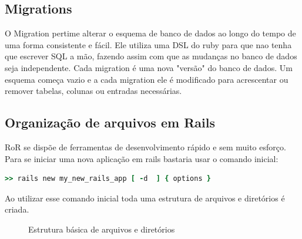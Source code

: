 \subsection{Migrations}
O Migration pertime alterar o esquema de banco de dados ao longo do tempo de uma forma consistente e fácil.
Ele utiliza uma DSL do ruby para que nao tenha que escrever SQL a mão, fazendo assim com que as mudanças no banco de dados
seja independente. Cada migration é uma nova "versão" do banco de dados. Um esquema começa vazio e a cada migration ele é modificado
para acrescentar ou remover tabelas, colunas ou entradas necessárias.

\subsection{Organização de arquivos em Rails}
RoR se dispõe de ferramentas de desenvolvimento rápido e sem muito esforço. Para se iniciar uma nova aplicação em rails
bastaria usar o comando inicial:

{\singlespace
\begin{lstlisting}[caption=Exemplo de uso de scaffold, language=Ruby,label={scaffold}]
  >> rails new my_new_rails_app [ -d  ] { options }
\end{lstlisting}
}

Ao utilizar esse comando inicial toda uma estrutura de arquivos e diretórios é criada. 

\begin{figure}[ht]
    \centering
    \caption{Estrutura básica de arquivos e diretórios}
    \label{submeter}
\end{figure}


